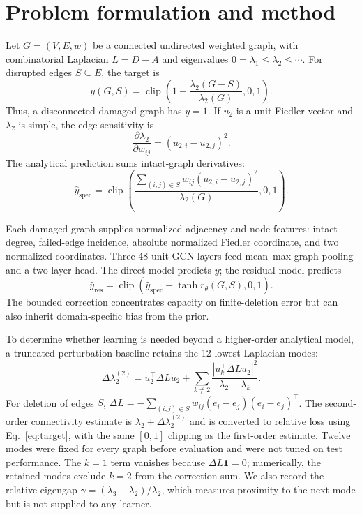 \documentclass[11pt]{article}
\begin{document}
\section{Problem formulation and method}
Let $G=(V,E,w)$ be a connected undirected weighted graph, with combinatorial
Laplacian $L=D-A$ and eigenvalues
$0=\lambda_1\leq\lambda_2\leq\cdots$. For disrupted edges $S\subseteq E$, the
target is
\begin{equation}
y(G,S)=\operatorname{clip}\!\left(1-\frac{\lambda_2(G-S)}{\lambda_2(G)},0,1\right).
\label{eq:target}
\end{equation}
Thus, a disconnected damaged graph has $y=1$. If $u_2$ is a unit Fiedler vector
and $\lambda_2$ is simple, the edge sensitivity is
\begin{equation}
\frac{\partial\lambda_2}{\partial w_{ij}}=(u_{2,i}-u_{2,j})^2.
\end{equation}
The analytical prediction sums intact-graph derivatives:
\begin{equation}
\widehat y_{\mathrm{spec}}=\operatorname{clip}\!\left(
\frac{\sum_{(i,j)\in S}w_{ij}(u_{2,i}-u_{2,j})^2}{\lambda_2(G)},0,1\right).
\label{eq:prior}
\end{equation}

Each damaged graph supplies normalized adjacency and node features: intact
degree, failed-edge incidence, absolute normalized Fiedler coordinate, and two
normalized coordinates. Three 48-unit GCN layers feed mean--max graph pooling
and a two-layer head. The direct model predicts $y$; the residual model predicts
\begin{equation}
\widehat y_{\mathrm{res}}=\operatorname{clip}\left(
\widehat y_{\mathrm{spec}}+\tanh r_\theta(G,S),0,1\right).
\label{eq:residual}
\end{equation}
The bounded correction concentrates capacity on finite-deletion error but can
also inherit domain-specific bias from the prior.

To determine whether learning is needed beyond a higher-order analytical model, a
truncated perturbation baseline retains the 12 lowest Laplacian modes:
\begin{equation}
\Delta\lambda_2^{(2)}=u_2^\top\Delta L u_2+
\sum_{k\ne2}\frac{|u_k^\top\Delta L u_2|^2}{\lambda_2-\lambda_k}.
\end{equation}
For deletion of edges $S$, $\Delta L=-\sum_{(i,j)\in S}w_{ij}
(e_i-e_j)(e_i-e_j)^\top$. The second-order connectivity estimate is
$\lambda_2+\Delta\lambda_2^{(2)}$ and is converted to relative loss using
Eq.~\eqref{eq:target}, with the same $[0,1]$ clipping as the first-order estimate. Twelve
modes were fixed for every graph before evaluation and were not tuned on test
performance. The $k=1$ term vanishes because $\Delta L\mathbf{1}=0$;
numerically, the retained modes exclude $k=2$ from the correction sum.
We also record the relative eigengap
$\gamma=(\lambda_3-\lambda_2)/\lambda_2$, which measures proximity to the next
mode but is not supplied to any learner.
\end{document}
